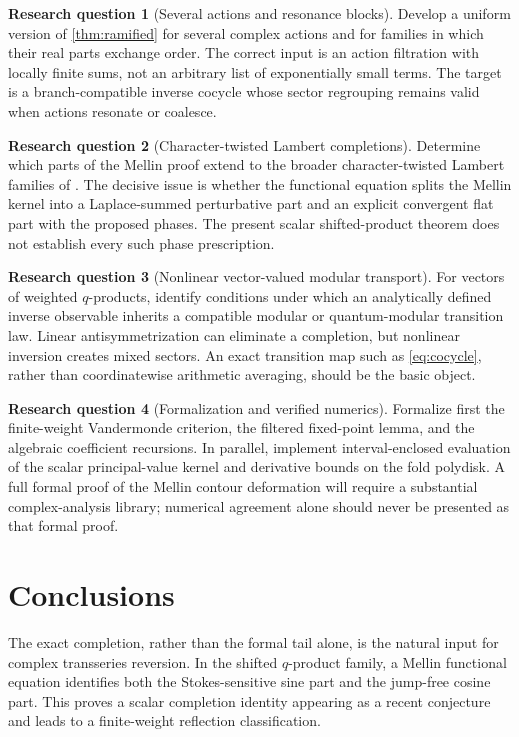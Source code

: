 \documentclass[11pt,a4paper]{article}
\numberwithin{equation}{section}
\theoremstyle{definition}
\newtheorem{problem}{Research question}
\theoremstyle{remark}
\begin{document}
\begin{problem}[Several actions and resonance blocks]
Develop a uniform version of \cref{thm:ramified} for several complex
actions and for families in which their real parts exchange order.
The correct input is an action filtration with locally finite sums,
not an arbitrary list of exponentially small terms. The target is a
branch-compatible inverse cocycle whose sector regrouping remains
valid when actions resonate or coalesce.
\end{problem}

\begin{problem}[Character-twisted Lambert completions]
Determine which parts of the Mellin proof extend to the broader
character-twisted Lambert families of \cite{bd}. The decisive issue is
whether the functional equation splits the Mellin kernel into a
Laplace-summed perturbative part and an explicit convergent flat part
with the proposed phases. The present scalar shifted-product theorem
does not establish every such phase prescription.
\end{problem}

\begin{problem}[Nonlinear vector-valued modular transport]
For vectors of weighted $q$-products, identify conditions under which
an analytically defined inverse observable inherits a compatible
modular or quantum-modular transition law. Linear antisymmetrization
can eliminate a completion, but nonlinear inversion creates mixed
sectors. An exact transition map such as \eqref{eq:cocycle}, rather
than coordinatewise arithmetic averaging, should be the basic object.
\end{problem}

\begin{problem}[Formalization and verified numerics]
Formalize first the finite-weight Vandermonde criterion, the filtered
fixed-point lemma, and the algebraic coefficient recursions. In
parallel, implement interval-enclosed evaluation of the scalar
principal-value kernel and derivative bounds on the fold polydisk.
A full formal proof of the Mellin contour deformation will require a
substantial complex-analysis library; numerical agreement alone
should never be presented as that formal proof.
\end{problem}

\section{Conclusions}
The exact completion, rather than the formal tail alone, is the
natural input for complex transseries reversion. In the shifted
$q$-product family, a Mellin functional equation identifies both the
Stokes-sensitive sine part and the jump-free cosine part. This proves
a scalar completion identity appearing as a recent conjecture and
leads to a finite-weight reflection classification.
\end{document}
